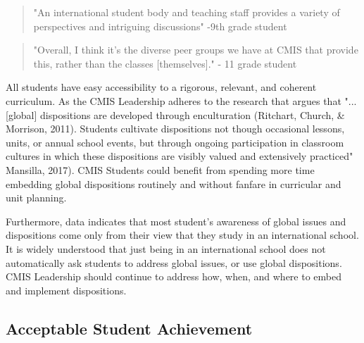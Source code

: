 \begin{findings}
\blockquote{"An international student body and teaching staff provides a variety of perspectives and intriguing discussions" -9th grade student}

\blockquote{"Overall, I think it's the diverse peer groups we have at CMIS that provide this, rather than the classes [themselves]." - 11 grade student}


All students have easy accessibility to a rigorous, relevant, and coherent curriculum.  As the CMIS Leadership adheres to the research that argues that   "...[global] dispositions are developed through enculturation (Ritchart, Church, \& Morrison, 2011). Students cultivate dispositions not though occasional lessons, units, or annual school events, but through ongoing participation in classroom cultures in which these dispositions are visibly valued and extensively practiced" Mansilla, 2017). CMIS Students could benefit from spending more time embedding global dispositions routinely and without fanfare in curricular and unit planning. 

Furthermore, data indicates that most student's awareness of global issues and dispositions come only from their view that they study in an international school. It is widely understood that just being in an international school does not automatically ask students to address global issues, or use global dispositions. CMIS Leadership should continue to address how, when, and where to embed and implement dispositions.  
\end{findings}

\subsection{Acceptable Student Achievement}



